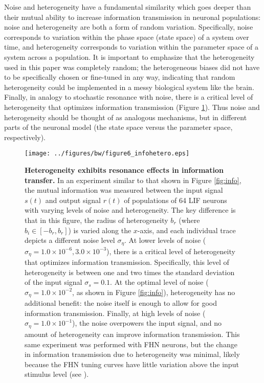 \documentclass[12pt]{article}
\newcommand{\fig}[1]{Figure \ref{fig:#1}}
\newcommand{\figlabel}[1]{\label{fig:#1}}
\newcommand{\scn}[1]{\textsc{\nameref{scn:#1}}}
\begin{document}
Noise and heterogeneity have a fundamental similarity which goes deeper than their mutual ability to increase information transmission in neuronal populations: noise and heterogeneity are both a form of random variation. Specifically, noise corresponds to variation within the phase space (state space) of a system over time, and heterogeneity corresponds to variation within the parameter space of a system across a population. It is important to emphasize that the heterogeneity used in this paper was completely random; the heterogeneous biases did not have to be specifically chosen or fine-tuned in any way, indicating that random heterogeneity could be implemented in a messy biological system like the brain. Finally, in analogy to stochastic resonance with noise, there is a critical level of heterogeneity that optimizes information transmission (\fig{infohetero}). Thus noise and heterogeneity should be thought of as analogous mechanisms, but in different parts of the neuronal model (the state space versus the parameter space, respectively).

\begin{figure}
  \ifx\hidefigures\undefined
    \centering
    \texttt{[image: ../figures/bw/figure6\_infohetero.eps]}
  \fi
  \caption{
    \textbf{Heterogeneity exhibits resonance effects in information transfer.} In an experiment similar to that shown in \fig{info}, the mutual information was measured between the input signal $s(t)$ and output signal $r(t)$ of populations of 64 LIF neurons with varying levels of noise and heterogeneity. The key difference is that in this figure, the radius of heterogeneity $b_r$ (where $b_i \in [-b_r, b_r]$) is varied along the $x$-axis, and each individual trace depicts a different noise level $\sigma_\eta$. At lower levels of noise ($\sigma_\eta = 1.0 \times 10^{-6}, 3.0 \times 10^{-3}$), there is a critical level of heterogeneity that optimizes information transmission. Specifically, this level of heterogeneity is between one and two times the standard deviation of the input signal $\sigma_s = 0.1$. At the optimal level of noise ($\sigma_\eta = 1.0 \times 10^{-2}$, as shown in \fig{info}), heterogeneity has no additional benefit: the noise itself is enough to allow for good information transmission. Finally, at high levels of noise ($\sigma_\eta = 1.0 \times 10^{-1}$), the noise overpowers the input signal, and no amount of heterogeneity can improve information transmission. This same experiment was performed with FHN neurons, but the change in information transmission due to heterogeneity was minimal, likely because the FHN tuning curves have little variation above the input stimulus level (see \scn{discussion}).
  }
  \figlabel{infohetero}
\end{figure}
\end{document}
